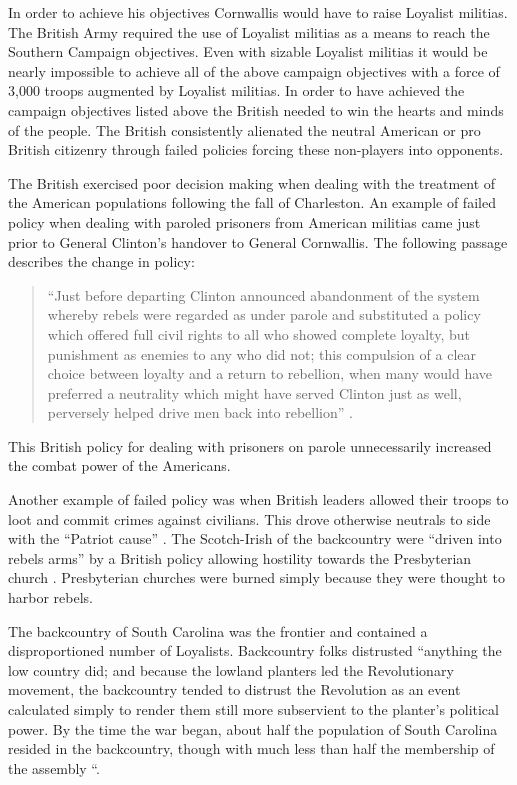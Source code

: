 In order to achieve his objectives Cornwallis would have to raise Loyalist
militias.  The British Army required the use of Loyalist militias as a means to
reach the Southern Campaign objectives.  Even with sizable Loyalist militias it
would be nearly impossible to achieve all of the above campaign objectives with
a force of 3,000 troops augmented by Loyalist militias.   In order to have
achieved the campaign objectives listed above the British needed to win the
hearts and minds of the people.  The British consistently alienated the neutral
American or pro British citizenry through failed policies forcing these
non-players into opponents.  

The British exercised poor decision making when dealing with the treatment of
the American populations following the fall of Charleston.  An example of failed
policy when dealing with paroled prisoners from American militias came just
prior to General Clinton’s handover to General Cornwallis.  The following
passage describes the change in policy:

\begin{quote} “Just before departing Clinton announced abandonment of the system
  whereby rebels were regarded as under parole and substituted a policy which
  offered full civil rights to all who showed complete loyalty, but punishment
  as enemies to any who did not; this compulsion of a clear choice between
  loyalty and a return to rebellion, when many would have preferred a neutrality
  which might have served Clinton just as well, perversely helped drive men back
  into rebellion” \cite[p.12]{weigley_partisan_1970}.  \end{quote} 

This British policy for dealing with prisoners on parole unnecessarily increased
the combat power of the Americans.

Another example of failed policy was when British leaders allowed their troops
to loot and commit crimes against civilians.  This drove otherwise neutrals to
side with the “Patriot cause” \cite[p.13]{weigley_partisan_1970}.   The Scotch-Irish of the
backcountry were “driven into rebels arms” by a British policy allowing
hostility towards the Presbyterian church \cite[p.13]{weigley_partisan_1970}.  Presbyterian
churches were burned simply because they were thought to harbor rebels.  

The backcountry of South Carolina was the frontier and contained a
disproportioned number of Loyalists.  Backcountry folks distrusted “anything the
low country did; and because the lowland planters led the Revolutionary
movement, the backcountry tended to distrust the Revolution as an event
calculated simply to render them still more subservient to the planter’s
political power.  By the time the war began, about half the population of South
Carolina resided in the backcountry, though with much less than half the
membership of the assembly “\cite[p.11]{weigley_partisan_1970}.  

